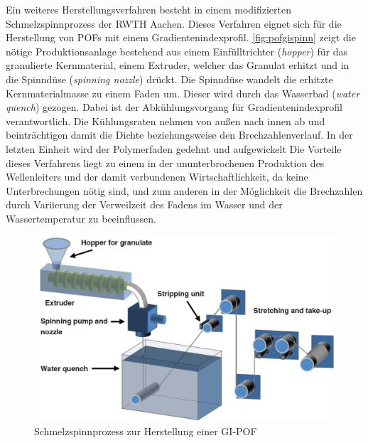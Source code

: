 Ein weiteres Herstellungsverfahren besteht in einem modifizierten
Schmelzspinnprozess der RWTH Aachen. Dieses Verfahren eignet sich für die
Herstellung von POFs mit einem Gradientenindexprofil. \autoref{fig:pofgispinn}
zeigt die nötige Produktionsanlage bestehend aus einem Einfülltrichter
(\textit{hopper}) für das granulierte Kernmaterial, einem Extruder, welcher das
Granulat erhitzt und in die Spinndüse (\textit{spinning nozzle}) drückt. Die
Spinndüse wandelt die erhitzte Kernmaterialmasse zu einem Faden um. Dieser wird
durch das Wasserbad (\textit{water quench}) gezogen. Dabei ist der
Abkühlungsvorgang für Gradientenindexprofil verantwortlich. Die Kühlungsraten
nehmen von außen nach innen ab und beinträchtigen damit die Dichte
beziehungsweise den Brechzahlenverlauf. In der letzten Einheit wird der
Polymerfaden gedehnt und aufgewickelt Die Vorteile dieses Verfahrens liegt zu
einem in der ununterbrochenen Produktion des Wellenleiters und der damit
verbundenen Wirtschaftlichkeit, da keine Unterbrechungen nötig sind, und zum
anderen in der Möglichkeit die Brechzahlen durch Variierung der Verweilzeit des
Fadens im Wasser und der Wassertemperatur zu beeinflussen.  \cite{pofspinn}

\begin{figure}[h]
    \begin{center}
        \begin{minipage}[t]{\textwidth}
            \begin{center}
                \includegraphics[height=0.25\textheight]{Bilder/Optische_Wellenleiter_Die_Polymer_Optische_Faser/Herstellung/pofgispinn.png}
                \caption[Schmelzspinnprozess zur Herstellung einer GI-POF \newline \url{http://www.researchgate.net/publication/265646639_An_overview_on_fabrication_methods_for_polymer_optical_fibers} S. 9 (zuletzt aufgerufen am 28.09.2015)]{Schmelzspinnprozess zur Herstellung einer GI-POF}
                \label{fig:pofgispinn}
            \end{center}
        \end{minipage}
    \end{center}
\end{figure}
